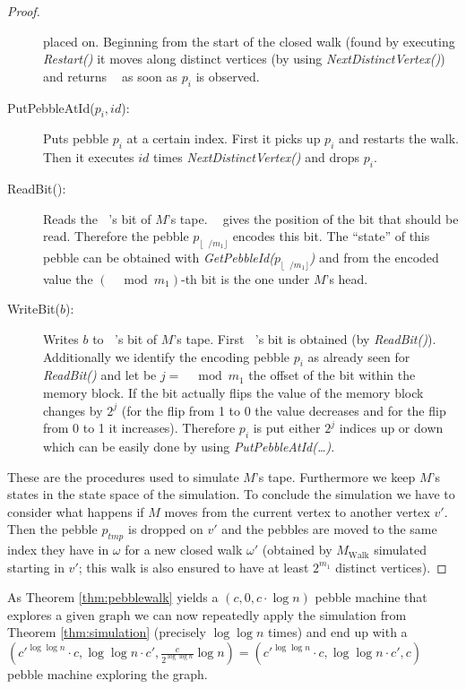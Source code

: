 \documentclass[draft,oneside]{scrartcl}
\DeclareMathOperator{\Tid}{T_{\text{id}}}
\DeclareMathOperator{\Thead}{T_{\text{head}}}
\begin{document}
\begin{proof}
\begin{description}
      placed on. Beginning from the start of the closed walk
      (found by executing \emph{Restart()} it moves along distinct vertices
      (by using \emph{NextDistinctVertex()}) and returns $\Tid$ as soon as
      $p_{i}$ is observed.
    \item[PutPebbleAtId($p_{i},\mathit{id}$):] Puts pebble $p_i$ at a certain
      index. First it picks up $p_{i}$ and restarts the walk. Then it executes
      $\mathit{id}$ times \emph{NextDistinctVertex()} and drops $p_{i}$.
    \item[ReadBit():] Reads the $\Thead$'s bit of $M$'s tape. $\Thead$ gives
      the position of the bit that should be read. Therefore the pebble
      $p_{\lfloor \Thead/m_{1}\rfloor}$ encodes this bit. The \enquote{state}
      of this pebble can be obtained with
      \emph{GetPebbleId($p_{\lfloor \Thead/m_{1}\rfloor}$)} and from the
      encoded value the $(\Thead\mod m_{1})$-th bit is the one under $M$'s
      head.
    \item[WriteBit($b$):] Writes $b$ to $\Thead$'s bit of $M$'s tape. First
      $\Thead$'s bit is obtained (by \emph{ReadBit()}). Additionally we
      identify the encoding pebble $p_{i}$ as already seen for
      \emph{ReadBit()} and let be $j = \Thead\mod m_{1}$ the offset of the bit
      within the memory block. If the bit actually flips the value of the
      memory block changes by $2^j$ (for the flip from 1 to 0 the value
      decreases and for the flip from 0 to 1 it increases). Therefore $p_{i}$
      is put either $2^j$ indices up or down which can be easily done by using
      \emph{PutPebbleAtId(\dots)}.
  \end{description}
  These are the procedures used to simulate $M$'s tape. Furthermore we keep
  $M$'s states in the state space of the simulation. To conclude the simulation
  we have to consider what happens if $M$ moves from the current vertex to
  another vertex $v'$. Then the pebble $p_{tmp}$ is dropped on $v'$ and the
  pebbles are moved to the same index they have in $\omega$ for a new closed
  walk $\omega'$ (obtained by $M_{\text{Walk}}$ simulated starting in $v'$;
  this walk is also ensured to have at least $2^{m_1}$ distinct vertices).
\end{proof}
As Theorem \ref{thm:pebblewalk} yields a $(c,0,c\cdot\log n)$ pebble machine
that explores a given graph we can now repeatedly apply the simulation
from Theorem \ref{thm:simulation} (precisely $\log\log n$ times) and end up
with a $(c'^{\log\log n}\cdot c, \log\log n\cdot c',
\frac{c}{2^{\log\log n}}\log n) =
(c'^{\log\log n}\cdot c, \log\log n\cdot c', c)$ pebble machine exploring the
graph.
\end{document}
